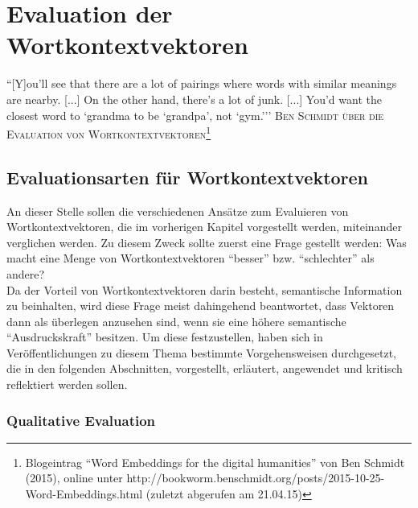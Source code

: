 
\chapter{Evaluation der Wortkontextvektoren} %

\label{Chapter5} %


\begin{itquote}
``[Y]ou’ll see that there are a lot of pairings where words with similar meanings are nearby. [...]
On the other hand, there’s a lot of junk. [...] You’d want the closest word to `grandma to be `grandpa', not `gym.'''
\flushright
\textsc{Ben Schmidt über die Evaluation von Wortkontextvektoren\footnote{Blogeintrag ``Word Embeddings for the digital humanities'' von Ben Schmidt (2015),
online unter http://bookworm.benschmidt.org/posts/2015-10-25-Word-Embeddings.html (zuletzt abgerufen am 21.04.15)}}
\end{itquote}


\section{Evaluationsarten für Wortkontextvektoren}

An dieser Stelle sollen die verschiedenen Ansätze zum Evaluieren von Wortkontextvektoren, die im vorherigen Kapitel
vorgestellt werden, miteinander verglichen werden. Zu diesem Zweck sollte zuerst eine Frage gestellt werden:
Was macht eine Menge von Wortkontextvektoren ``besser'' bzw. ``schlechter'' als andere?\\
Da der Vorteil von Wortkontextvektoren darin besteht, semantische Information zu beinhalten, wird diese
Frage meist dahingehend beantwortet, dass Vektoren dann als überlegen anzusehen sind, wenn sie
eine höhere semantische ``Ausdruckskraft'' besitzen. Um diese festzustellen, haben sich in Veröffentlichungen
zu diesem Thema bestimmte Vorgehensweisen durchgesetzt, die in den folgenden Abschnitten, vorgestellt, erläutert,
angewendet und kritisch reflektiert werden sollen.\\

  \subsection{Qualitative Evaluation}

